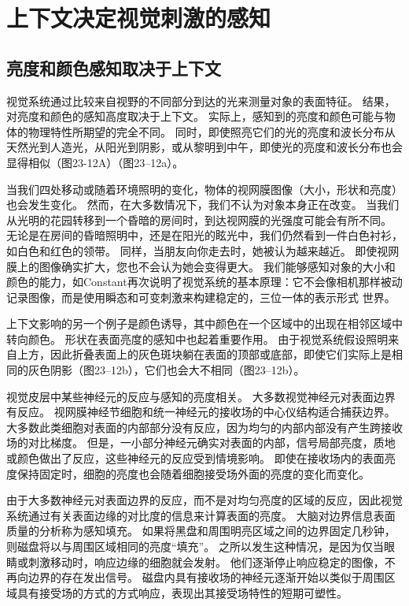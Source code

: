 \section{上下文决定视觉刺激的感知}

\subsection{亮度和颜色感知取决于上下文}

视觉系统通过比较来自视野的不同部分到达的光来测量对象的表面特征。
结果，对亮度和颜色的感知高度取决于上下文。 
实际上，感知到的亮度和颜色可能与物体的物理特性所期望的完全不同。
同时，即使照亮它们的光的亮度和波长分布从天然光到人造光，从阳光到阴影，或从黎明到中午，即使光的亮度和波长分布也会显得相似（图23-12A）（图23–12a）。


当我们四处移动或随着环境照明的变化，物体的视网膜图像（大小，形状和亮度）也会发生变化。
然而，在大多数情况下，我们不认为对象本身正在改变。 
当我们从光明的花园转移到一个昏暗的房间时，到达视网膜的光强度可能会有所不同。
无论是在房间的昏暗照明中，还是在阳光的眩光中，我们仍然看到一件白色衬衫，如白色和红色的领带。
同样，当朋友向你走去时，她被认为越来越近。
即使视网膜上的图像确实扩大，您也不会认为她会变得更大。
我们能够感知对象的大小和颜色的能力，如Constant再次说明了视觉系统的基本原理：它不会像相机那样被动记录图像，而是使用瞬态和可变刺激来构建稳定的，三位一体的表示形式 世界。


上下文影响的另一个例子是颜色诱导，其中颜色在一个区域中的出现在相邻区域中转向颜色。
形状在表面亮度的感知中也起着重要作用。
由于视觉系统假设照明来自上方，因此折叠表面上的灰色斑块躺在表面的顶部或底部，即使它们实际上是相同的灰色阴影（图23–12b），它们也会大不相同（图23–12b）。


视觉皮层中某些神经元的反应与感知的亮度相关。 
大多数视觉神经元对表面边界有反应。
视网膜神经节细胞和统一神经元的接收场的中心仪结构适合捕获边界。
大多数此类细胞对表面的内部部分没有反应，因为均匀的内部内部没有产生跨接收场的对比梯度。
但是，一小部分神经元确实对表面的内部，信号局部亮度，质地或颜色做出了反应，这些神经元的反应受到情境影响。
即使在接收场内的表面亮度保持固定时，细胞的亮度也会随着细胞接受场外面的亮度的变化而变化。


由于大多数神经元对表面边界的反应，而不是对均匀亮度的区域的反应，因此视觉系统通过有关表面边缘的对比度的信息来计算表面的亮度。
大脑对边界信息表面质量的分析称为感知填充。
如果将黑盘和周围明亮区域之间的边界固定几秒钟，则磁盘将以与周围区域相同的亮度“填充”。
之所以发生这种情况，是因为仅当眼睛或刺激移动时，响应边缘的细胞就会发射。
他们逐渐停止响应稳定的图像，不再向边界的存在发出信号。
磁盘内具有接收场的神经元逐渐开始以类似于周围区域具有接受场的方式的方式响应，表现出其接受场特性的短期可塑性。


